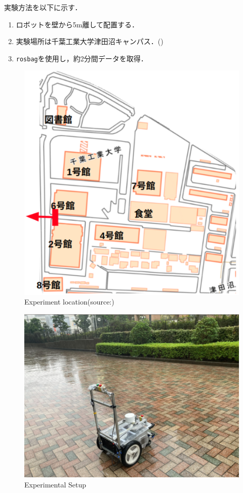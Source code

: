 実験方法を以下に示す．
\begin{enumerate}
    \item ロボットを壁から5m離して配置する．
    \item 実験場所は千葉工業大学津田沼キャンパス．()
    \item \texttt{rosbag}を使用し，約2分間データを取得．
\end{enumerate}

\begin{figure}[H]
  \centering
  \includegraphics[keepaspectratio, scale=0.5]{images/png/ex_map3.pdf}
  \caption{Experiment location(source:\cite{mura})}
  \label{Fig:4.3}
\end{figure}

\begin{figure}[H]
  \centering
  \includegraphics[keepaspectratio, scale=0.7]{images/png/ex.png}
  \caption{Experimental Setup}
  \label{Fig:4.4}
\end{figure}

